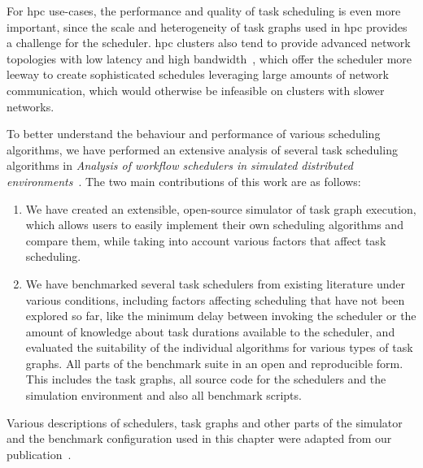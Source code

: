 For \gls{hpc} use-cases, the performance and quality of task scheduling is even more
important, since the scale and heterogeneity of task graphs used in \gls{hpc}
provides a challenge for the scheduler. \gls{hpc} clusters also tend to provide
advanced network topologies with low latency and high bandwidth~\cite{dragonfly,slimfly}, which
offer the scheduler more leeway to create sophisticated schedules leveraging large amounts of
network communication, which would otherwise be infeasible on clusters with slower networks.

To better understand the behaviour and performance of various scheduling algorithms, we have
performed an extensive analysis of several task scheduling algorithms in
\emph{Analysis of workflow schedulers in simulated distributed environments}~\cite{estee}. The two main contributions of this work are as
follows:
\begin{enumerate}
	\item We have created an extensible, open-source simulator of task graph execution, which allows users to
	      easily implement their own scheduling algorithms and compare them, while taking into account
	      various factors that affect task scheduling.
	\item We have benchmarked several task schedulers from existing literature under various conditions,
	      including factors affecting scheduling that have not been explored so far, like the minimum delay
	      between invoking the scheduler or the amount of knowledge about task durations available to the
	      scheduler, and evaluated the suitability of the individual algorithms for various types of task
	      graphs. All parts of the benchmark suite in an open and reproducible form. This includes the task
	      graphs, all source code for the schedulers and the simulation environment and also all benchmark
	      scripts.
\end{enumerate}

Various descriptions of schedulers, task graphs and other parts of the simulator and the benchmark
configuration used in this chapter were adapted from our publication~\cite{estee}.


